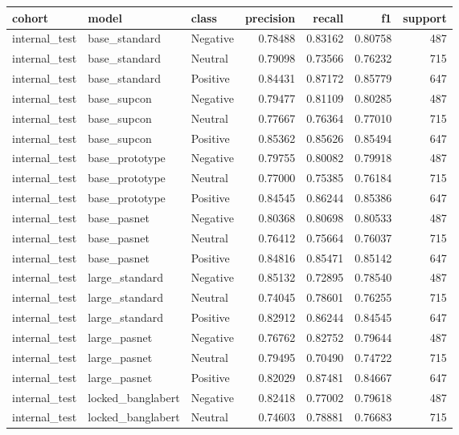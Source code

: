 \begin{tabular}{lllrrrr}
\toprule
cohort & model & class & precision & recall & f1 & support \\
\midrule
internal\_test & base\_standard & Negative & 0.78488 & 0.83162 & 0.80758 & 487 \\
internal\_test & base\_standard & Neutral & 0.79098 & 0.73566 & 0.76232 & 715 \\
internal\_test & base\_standard & Positive & 0.84431 & 0.87172 & 0.85779 & 647 \\
internal\_test & base\_supcon & Negative & 0.79477 & 0.81109 & 0.80285 & 487 \\
internal\_test & base\_supcon & Neutral & 0.77667 & 0.76364 & 0.77010 & 715 \\
internal\_test & base\_supcon & Positive & 0.85362 & 0.85626 & 0.85494 & 647 \\
internal\_test & base\_prototype & Negative & 0.79755 & 0.80082 & 0.79918 & 487 \\
internal\_test & base\_prototype & Neutral & 0.77000 & 0.75385 & 0.76184 & 715 \\
internal\_test & base\_prototype & Positive & 0.84545 & 0.86244 & 0.85386 & 647 \\
internal\_test & base\_pasnet & Negative & 0.80368 & 0.80698 & 0.80533 & 487 \\
internal\_test & base\_pasnet & Neutral & 0.76412 & 0.75664 & 0.76037 & 715 \\
internal\_test & base\_pasnet & Positive & 0.84816 & 0.85471 & 0.85142 & 647 \\
internal\_test & large\_standard & Negative & 0.85132 & 0.72895 & 0.78540 & 487 \\
internal\_test & large\_standard & Neutral & 0.74045 & 0.78601 & 0.76255 & 715 \\
internal\_test & large\_standard & Positive & 0.82912 & 0.86244 & 0.84545 & 647 \\
internal\_test & large\_pasnet & Negative & 0.76762 & 0.82752 & 0.79644 & 487 \\
internal\_test & large\_pasnet & Neutral & 0.79495 & 0.70490 & 0.74722 & 715 \\
internal\_test & large\_pasnet & Positive & 0.82029 & 0.87481 & 0.84667 & 647 \\
internal\_test & locked\_banglabert & Negative & 0.82418 & 0.77002 & 0.79618 & 487 \\
internal\_test & locked\_banglabert & Neutral & 0.74603 & 0.78881 & 0.76683 & 715 \\

\end{tabular}
